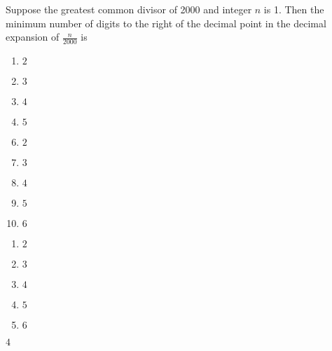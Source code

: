 

  Suppose the greatest common divisor of 2000 and integer $n$ is 1.  Then the minimum number of digits to the right of the decimal point in the decimal expansion of $\frac{n}{2000}$ is 


\ifsat
	\begin{enumerate}[label=\Alph*)]
		\item    $2$
		\item  $3$ 
		\item $4$ %
		\item $5$ 
	\end{enumerate}
\else
\fi

\ifacteven
	\begin{enumerate}[label=\textbf{\Alph*.},itemsep=\fill,align=left]
		\setcounter{enumii}{5}
		\item    $2$
		\item  $3$ 
		\item $4$ %
		\addtocounter{enumii}{1}
		\item $5$ 
		\item  $6$ 
	\end{enumerate}
\else
\fi

\ifactodd
	\begin{enumerate}[label=\textbf{\Alph*.},itemsep=\fill,align=left]
		\item    $2$
		\item  $3$ 
		\item $4$ %
		\item $5$ 
		\item  $6$ 
	\end{enumerate}
\else
\fi

\ifgridin
 $4$ %
		
\else
\fi

